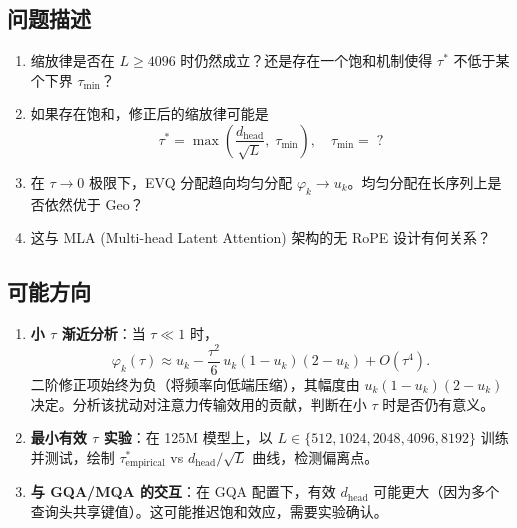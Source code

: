 \documentclass[11pt,a4paper]{article}
\newcommand{\zh}[1]{{\zhfont #1}}
\begin{document}
\subsection*{\zh{问题描述}}
\begin{enumerate}[leftmargin=2em]
  \item \zh{缩放律是否在} $L \geq 4096$ \zh{时仍然成立？还是存在一个饱和机制使得} $\tau^*$ \zh{不低于某个下界} $\tau_{\min}$\zh{？}
  \item \zh{如果存在饱和，修正后的缩放律可能是}
  \begin{equation}
    \tau^* = \max\!\left(\frac{d_{\mathrm{head}}}{\sqrt{L}},\; \tau_{\min}\right),
    \quad \tau_{\min} = \;?
  \end{equation}
  \item \zh{在} $\tau \to 0$ \zh{极限下，}EVQ \zh{分配趋向均匀分配} $\varphi_k \to u_k$\zh{。均匀分配在长序列上是否依然优于} Geo\zh{？}
  \item \zh{这与} MLA (Multi-head Latent Attention) \zh{架构的无} RoPE \zh{设计有何关系？}
\end{enumerate}

\subsection*{\zh{可能方向}}
\begin{enumerate}[leftmargin=2em]
  \item \textbf{\zh{小} $\tau$ \zh{渐近分析}}\zh{：当} $\tau \ll 1$ \zh{时，}
  \begin{equation}
    \varphi_k(\tau) \approx u_k - \frac{\tau^2}{6}\,u_k(1-u_k)(2-u_k) + O(\tau^4).
  \end{equation}
  \zh{二阶修正项始终为负（将频率向低端压缩），其幅度由} $u_k(1-u_k)(2-u_k)$ \zh{决定。分析该扰动对注意力传输效用的贡献，判断在小} $\tau$ \zh{时是否仍有意义。}
  \item \textbf{\zh{最小有效} $\tau$ \zh{实验}}\zh{：在} 125M \zh{模型上，以} $L \in \{512, 1024, 2048, 4096, 8192\}$ \zh{训练并测试，绘制} $\tau^*_{\mathrm{empirical}}$ vs $d_{\mathrm{head}}/\sqrt{L}$ \zh{曲线，检测偏离点。}
  \item \textbf{\zh{与} GQA/MQA \zh{的交互}}\zh{：在} GQA \zh{配置下，有效} $d_{\mathrm{head}}$ \zh{可能更大（因为多个查询头共享键值）。这可能推迟饱和效应，需要实验确认。}
\end{enumerate}

\vspace{20pt}
\end{document}
